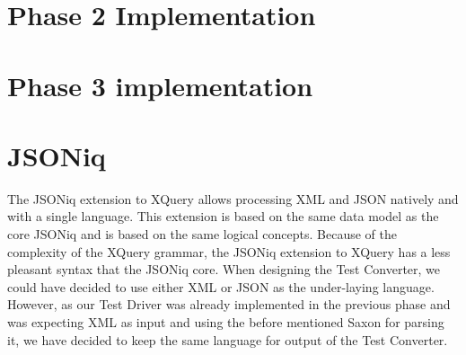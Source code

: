\section{Phase 2 Implementation}

\section{Phase 3 implementation}




\section{JSONiq}
The JSONiq extension to XQuery allows processing XML and JSON natively and with a single language. This extension is based on the same data model as the core JSONiq and is based on the same logical concepts. Because of the complexity of the XQuery grammar, the JSONiq extension to XQuery has a less pleasant syntax that the JSONiq core. When designing the Test Converter, we could have decided to use either XML or JSON as the under-laying language. However, as our Test Driver was already implemented in the previous phase and was expecting XML as input and using the before mentioned Saxon for parsing it, we have decided to keep the same language for output of the Test Converter.